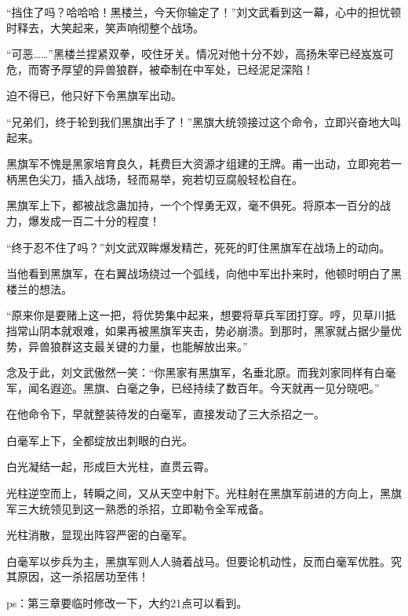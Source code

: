 \begin{this_body}
“挡住了吗？哈哈哈！黑楼兰，今天你输定了！”刘文武看到这一幕，心中的担忧顿时释去，大笑起来，笑声响彻整个战场。

“可恶……”黑楼兰捏紧双拳，咬住牙关。情况对他十分不妙，高扬朱宰已经岌岌可危，而寄予厚望的异兽狼群，被牵制在中军处，已经泥足深陷！

迫不得已，他只好下令黑旗军出动。

“兄弟们，终于轮到我们黑旗出手了！”黑旗大统领接过这个命令，立即兴奋地大叫起来。

黑旗军不愧是黑家培育良久，耗费巨大资源才组建的王牌。甫一出动，立即宛若一柄黑色尖刀，插入战场，轻而易举，宛若切豆腐般轻松自在。

黑旗军上下，都被战念蛊加持，一个个悍勇无双，毫不俱死。将原本一百分的战力，爆发成一百二十分的程度！

“终于忍不住了吗？”刘文武双眸爆发精芒，死死的盯住黑旗军在战场上的动向。

当他看到黑旗军，在右翼战场绕过一个弧线，向他中军出扑来时，他顿时明白了黑楼兰的想法。

“原来你是要赌上这一把，将优势集中起来，想要将草兵军团打穿。哼，贝草川抵挡常山阴本就艰难，如果再被黑旗军夹击，势必崩溃。到那时，黑家就占据少量优势，异兽狼群这支最关键的力量，也能解放出来。”

念及于此，刘文武傲然一笑：“你黑家有黑旗军，名垂北原。而我刘家同样有白毫军，闻名遐迩。黑旗、白毫之争，已经持续了数百年。今天就再一见分晓吧。”

在他命令下，早就整装待发的白毫军，直接发动了三大杀招之一。

白毫军上下，全都绽放出刺眼的白光。

白光凝结一起，形成巨大光柱，直贯云霄。

光柱逆空而上，转瞬之间，又从天空中射下。光柱射在黑旗军前进的方向上，黑旗军三大统领见到这一熟悉的杀招，立即勒令全军戒备。

光柱消散，显现出阵容严密的白毫军。

白毫军以步兵为主，黑旗军则人人骑着战马。但要论机动性，反而白毫军优胜。究其原因，这一杀招居功至伟！

ps：第三章要临时修改一下，大约21点可以看到。

\end{this_body}

